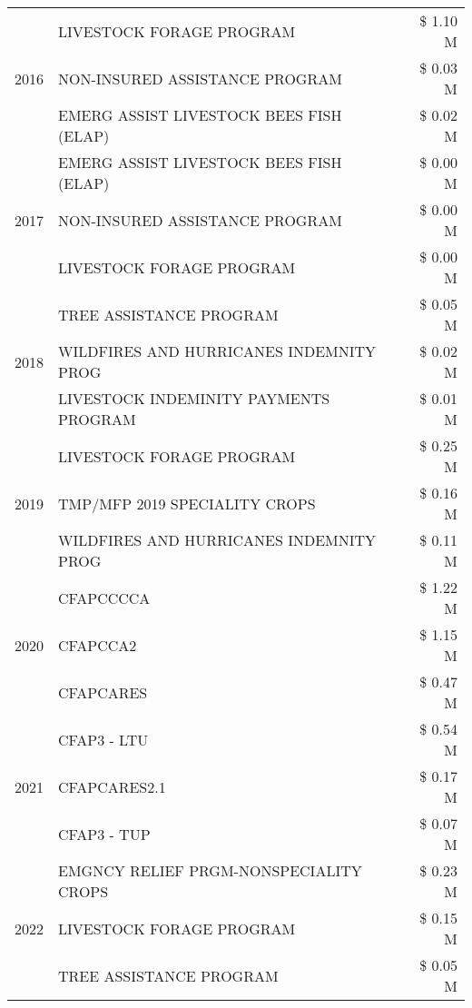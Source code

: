 \begin{tabular}{llr}
\cline{1-3}
\multirow[t]{3}{*}{2016} & LIVESTOCK FORAGE PROGRAM & \$ 1.10 M \\
 & NON-INSURED ASSISTANCE PROGRAM & \$ 0.03 M \\
 & EMERG ASSIST LIVESTOCK BEES FISH (ELAP) & \$ 0.02 M \\
\cline{1-3}
\multirow[t]{3}{*}{2017} & EMERG ASSIST LIVESTOCK BEES FISH (ELAP) & \$ 0.00 M \\
 & NON-INSURED ASSISTANCE PROGRAM & \$ 0.00 M \\
 & LIVESTOCK FORAGE PROGRAM & \$ 0.00 M \\
\cline{1-3}
\multirow[t]{3}{*}{2018} & TREE ASSISTANCE PROGRAM & \$ 0.05 M \\
 & WILDFIRES AND HURRICANES INDEMNITY PROG & \$ 0.02 M \\
 & LIVESTOCK INDEMINITY PAYMENTS PROGRAM & \$ 0.01 M \\
\cline{1-3}
\multirow[t]{3}{*}{2019} & LIVESTOCK FORAGE PROGRAM & \$ 0.25 M \\
 & TMP/MFP 2019 SPECIALITY CROPS & \$ 0.16 M \\
 & WILDFIRES AND HURRICANES INDEMNITY PROG & \$ 0.11 M \\
\cline{1-3}
\multirow[t]{3}{*}{2020} & CFAPCCCCA & \$ 1.22 M \\
 & CFAPCCA2 & \$ 1.15 M \\
 & CFAPCARES & \$ 0.47 M \\
\cline{1-3}
\multirow[t]{3}{*}{2021} & CFAP3 - LTU & \$ 0.54 M \\
 & CFAPCARES2.1 & \$ 0.17 M \\
 & CFAP3 - TUP & \$ 0.07 M \\
\cline{1-3}
\multirow[t]{3}{*}{2022} & EMGNCY RELIEF PRGM-NONSPECIALITY CROPS & \$ 0.23 M \\
 & LIVESTOCK FORAGE PROGRAM & \$ 0.15 M \\
 & TREE ASSISTANCE PROGRAM & \$ 0.05 M \\
\cline{1-3}
\bottomrule
\end{tabular}
